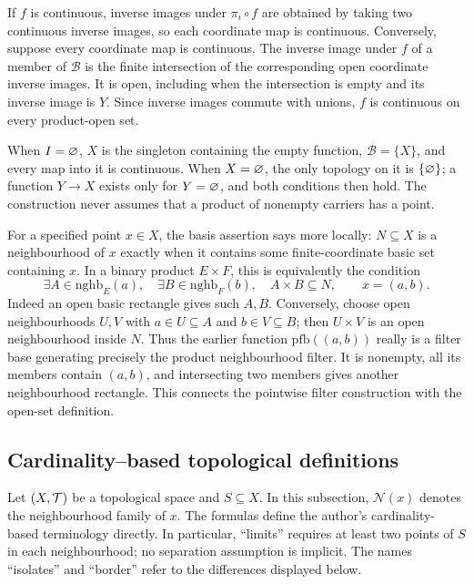 If $f$ is continuous, inverse images under $\pi_i\circ f$ are obtained
by taking two continuous inverse images, so each coordinate map is
continuous. Conversely, suppose every coordinate map is continuous.
The inverse image under $f$ of a member of $\mathcal B$ is the finite
intersection of the corresponding open coordinate inverse images.
It is open, including when the intersection is empty and its inverse
image is $Y$. Since inverse images commute with unions, $f$ is
continuous on every product-open set.

When $I=\varnothing$, $X$ is the singleton containing the empty
function, $\mathcal B=\{X\}$, and every map into it is continuous.
When $X=\varnothing$, the only topology on it is $\{\varnothing\}$;
a function $Y\to X$ exists only for $Y=\varnothing$, and both
conditions then hold. The construction never assumes that a product
of nonempty carriers has a point.
\Done

For a specified point $x\in X$, the basis assertion says more locally:
$N\subseteq X$ is a neighbourhood of $x$ exactly when it contains
some finite-coordinate basic set containing $x$. In a binary product
$E\times F$, this is equivalently the condition
\[
\exists A\in\mathrm{nghb}_E(a),\quad
\exists B\in\mathrm{nghb}_F(b),\quad A\times B\subseteq N,
\qquad x=(a,b).
\]
Indeed an open basic rectangle gives such $A,B$. Conversely, choose
open neighbourhoods $U,V$ with $a\in U\subseteq A$ and
$b\in V\subseteq B$; then $U\times V$ is an open neighbourhood
inside $N$. Thus the earlier function $\mathrm{pfb}((a,b))$ really
is a filter base generating precisely the product neighbourhood filter.
It is nonempty, all its members contain $(a,b)$, and intersecting two
members gives another neighbourhood rectangle. This connects the
pointwise filter construction with the open-set definition.

\fi %
\subsection{Cardinality--based topological definitions}
Let $(X,\mathcal{T})$ be a topological space and $S\subseteq X$. In this
subsection, $\mathcal{N}(x)$ denotes the neighbourhood family of $x$.
The formulas define the author's cardinality-based terminology directly.
In particular, ``limits'' requires at least two points of $S$ in each
neighbourhood; no separation assumption is implicit. The names
``isolates'' and ``border'' refer to the differences displayed below.


